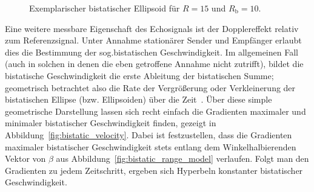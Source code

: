 \begin{figure}[htb]
    \centering
    \caption{Exemplarischer bistatischer Ellipsoid für \(R = 15\) und \(R_\text{b} = 10\).}\label{fig:bistatic_ellipsoid}
\end{figure}

Eine weitere messbare Eigenschaft des Echosignals ist der Dopplereffekt relativ zum Referenzsignal. Unter Annahme stationärer Sender und Empfänger erlaubt dies die Bestimmung der sog.\@ bistatischen Geschwindigkeit. Im allgemeinen Fall (auch in solchen in denen die eben getroffene Annahme nicht zutrifft), bildet die bistatische Geschwindigkeit die erste Ableitung der bistatischen Summe; geometrisch betrachtet also die Rate der Vergrößerung oder Verkleinerung der bistatischen Ellipse (bzw. Ellipsoiden) über die Zeit~\cite[S.~119]{Willis2005}. Über diese simple geometrische Darstellung lassen sich recht einfach die Gradienten maximaler und minimaler bistatischer Geschwindigkeit finden, gezeigt in Abbildung~\ref{fig:bistatic_velocity}. Dabei ist festzustellen, dass die Gradienten maximaler bistatischer Geschwindigkeit stets entlang dem Winkelhalbierenden Vektor von \(\beta \) aus Abbildung~\ref{fig:bistatic_range_model} verlaufen. Folgt man den Gradienten zu jedem Zeitschritt, ergeben sich Hyperbeln konstanter bistatischer Geschwindigkeit.

